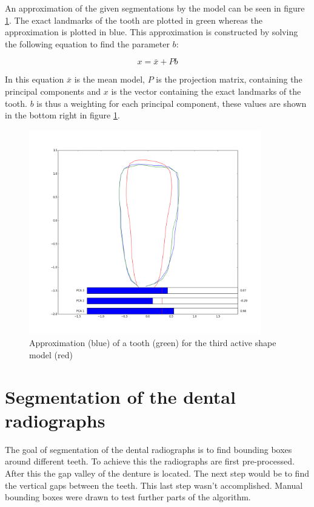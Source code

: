 \documentclass[a4paper,10pt]{article}
\begin{document}
An approximation of the given segmentations by the model can be seen in figure \ref{fig:pca_tooth}. The exact landmarks of the tooth are plotted in green whereas the approximation is plotted in blue. This approximation is constructed by solving the following equation to find the parameter $b$:

\begin{equation*}
	x = \bar{x} + Pb
\end{equation*}

In this equation $\bar{x}$ is the mean model, $P$ is the projection matrix, containing the principal components and $x$ is the vector containing the exact landmarks of the tooth. $b$ is thus a weighting for each principal component, these values are shown in the bottom right in figure \ref{fig:pca_tooth}.


\begin{figure}[htbp]
	\centering
	\includegraphics[width=0.9\textwidth, trim=0cm 2.5cm 0cm 3cm, clip]{pca_tooth}
	\caption{Approximation (blue) of a tooth (green) for the third active shape model (red)}
	\label{fig:pca_tooth}
\end{figure}

\clearpage
\section{Segmentation of the dental radiographs}
The goal of segmentation of the dental radiographs is to find bounding boxes around different teeth. To achieve this the radiographs are first pre-processed. After this the gap valley of the denture is located. The next step would be to find the vertical gaps between the teeth. This last step wasn't accomplished. Manual bounding boxes were drawn to test further parts of the algorithm.
\end{document}
